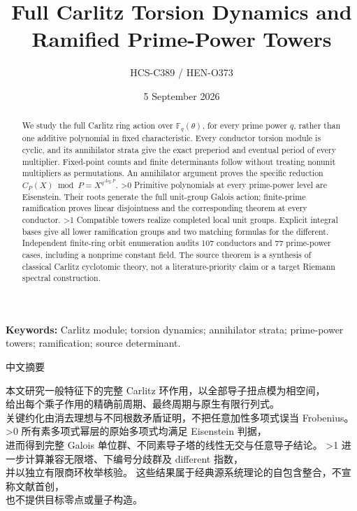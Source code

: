 \documentclass[10pt]{article}
\title{Full Carlitz Torsion Dynamics and Ramified Prime-Power Towers}
\author{HCS-C389 / HEN-O373}
\date{5 September 2026}
\newcommand{\F}{\mathbb F}
\begin{document}
\maketitle
\begin{abstract}
We study the full Carlitz ring action over $\F_q(\theta)$, for every prime
power $q$, rather than one additive polynomial in fixed characteristic.
Every conductor torsion module is cyclic, and its annihilator strata give
the exact preperiod and eventual period of every multiplier. Fixed-point
counts and finite determinants follow without treating nonunit multipliers
as permutations. An annihilator argument proves the specific reduction
$C_P(X)\bmod P=X^{q^{\deg P}}$.
\ifnum\CRevisionRound>0
Primitive polynomials at every prime-power level are Eisenstein. Their
roots generate the full unit-group Galois action; finite-prime ramification
proves linear disjointness and the corresponding theorem at every conductor.
\fi
\ifnum\CRevisionRound>1
Compatible towers realize completed local unit groups. Explicit integral
bases give all lower ramification groups and two matching formulas for the
different. Independent finite-ring orbit enumeration audits 107 conductors
and 77 prime-power cases, including a nonprime constant field.
\fi
The source theorem is a synthesis of classical Carlitz cyclotomic theory,
not a literature-priority claim or a target Riemann spectral construction.
\end{abstract}
\noindent\textbf{Keywords:} Carlitz module; torsion dynamics; annihilator strata;
prime-power towers; ramification; source determinant.

\begin{center}{\zhfont\large 中文摘要}\end{center}
{\zhfont\begin{flushleft}
本文研究一般特征下的完整 {\rmfamily Carlitz} 环作用，以全部导子扭点模为相空间，\\
给出每个乘子作用的精确前周期、最终周期与原生有限行列式。\\
关键约化由消去理想与不同根数矛盾证明，不把任意加性多项式误当 {\rmfamily Frobenius}。
\ifnum\CRevisionRound>0
所有素多项式幂层的原始多项式均满足 {\rmfamily Eisenstein} 判据，\\
进而得到完整 {\rmfamily Galois} 单位群、不同素导子塔的线性无交与任意导子结论。
\fi
\ifnum\CRevisionRound>1
进一步计算兼容无限塔、下编号分歧群及 {\rmfamily different} 指数，\\
并以独立有限商环枚举核验。
\fi
这些结果属于经典源系统理论的自包含整合，不宣称文献首创，\\
也不提供目标零点或量子构造。
\end{flushleft}}
\end{document}
